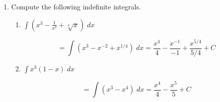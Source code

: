 \documentclass[11pt]{article}
\begin{document}
\pagestyle{empty}
\newsavebox{\quizfront}
\begin{lrbox}{\quizfront}
\begin{minipage}[top][4.5in][t]{\textwidth} \setlength{\parindent}{1.5em}
\drawtitle
\vspace{-0.5in}
\begin{enumerate}

\item Compute the following indefinite integrals.
  \begin{enumerate}
  \item $\displaystyle\int \left( x^3 - \frac{1}{x^2} +
    \sqrt[4]{x}\right)\;dx$
    
    \vfill  
    {\color{blue}

      \[
      = \int \left( x^3 - x^{-2} + x^{1/4}\right)\;dx = \frac{x^4}{4}
      - \frac{x^{-1}}{-1} + \frac{x^{5/4}}{5/4} + C
      \]

    }
    \vfill

  \item $\displaystyle\int x^3\left( 1 - x\right)\;dx$

    \vfill
    {\color{blue}

      \[
      =\int\left(x^3-x^4\right)\; dx = \frac{x^4}{4} - \frac{x^5}{5} + C
      \]

    }
    \vfill

  \end{enumerate}

\end{enumerate}


\end{minipage}
\end{lrbox}
\end{document}
